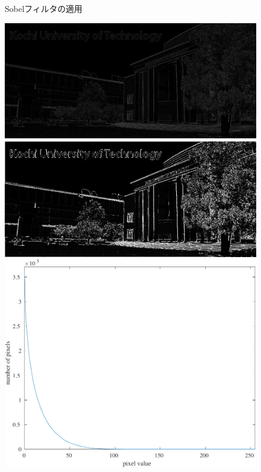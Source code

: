 \begin{figure}[H]
\begin{minipage}[b]{.3\textwidth}
    \end{minipage}
    \caption{Sobelフィルタの適用}
\end{figure}
\begin{figure}[H]
    \centering
    \begin{minipage}[b]{.3\textwidth}
        \centering
        \includegraphics[keepaspectratio,width=\textwidth]{../../Figures/06_41_lf-img}
    \end{minipage}
    \begin{minipage}[b]{.3\textwidth}
        \centering
        \includegraphics[keepaspectratio,width=\textwidth]{../../Figures/06_43_lf-img-thresholding.png}
    \end{minipage}
    \begin{minipage}[b]{.3\textwidth}
        \centering
        \includegraphics[keepaspectratio,width=\textwidth]{../../Figures/06_42_Thresholding-graph.pdf}

\end{minipage}
\end{figure}
